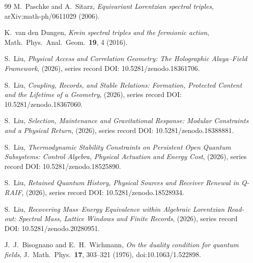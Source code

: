 \documentclass[12pt]{article}
\theoremstyle{definition}
\theoremstyle{remark}
\begin{document}
\begin{thebibliography}{99}
M.~Paschke and A.~Sitarz, \emph{Equivariant Lorentzian spectral triples}, arXiv:math-ph/0611029 (2006).

K.~van den Dungen, \emph{Krein spectral triples and the fermionic action}, Math.\ Phys.\ Anal.\ Geom.\ \textbf{19}, 4 (2016).

S.~Liu, \emph{Physical Access and Correlation Geometry: The Holographic Alaya--Field Framework}, (2026), series record DOI: 10.5281/zenodo.18361706.

S.~Liu, \emph{Coupling, Records, and Stable Relations: Formation, Protected Content and the Lifetime of a Geometry}, (2026), series record DOI: 10.5281/zenodo.18367060.

S.~Liu, \emph{Selection, Maintenance and Gravitational Response: Modular Constraints and a Physical Return}, (2026), series record DOI: 10.5281/zenodo.18388881.

S.~Liu, \emph{Thermodynamic Stability Constraints on Persistent Open Quantum Subsystems: Control Algebra, Physical Actuation and Energy Cost}, (2026), series record DOI: 10.5281/zenodo.18525890.

S.~Liu, \emph{Retained Quantum History, Physical Sources and Receiver Renewal in Q-RAIF}, (2026), series record DOI: 10.5281/zenodo.18528934.

S.~Liu, \emph{Recovering Mass--Energy Equivalence within Algebraic Lorentzian Read-out: Spectral Mass, Lattice Windows and Finite Records}, (2026), series record DOI: 10.5281/zenodo.20280951.

J.~J.~Bisognano and E.~H.~Wichmann, \emph{On the duality condition for quantum fields}, J.\ Math.\ Phys.\ \textbf{17}, 303--321 (1976), doi:10.1063/1.522898.

\end{thebibliography}
\end{document}
